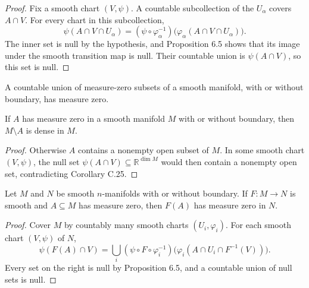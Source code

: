 \begin{proof}

\sketch Fix a smooth chart $(V,\psi)$. A countable subcollection of the $U_\alpha$ covers $A\cap V$. For every chart in this subcollection,
\[
\psi(A\cap V\cap U_\alpha)
=(\psi\circ\varphi_\alpha^{-1})
\bigl(\varphi_\alpha(A\cap V\cap U_\alpha)\bigr).
\]
The inner set is null by the hypothesis, and Proposition 6.5 shows that its image under the smooth transition map is null. Their countable union is $\psi(A\cap V)$, so this set is null.
\end{proof}

\begin{proposition}
\label{exer:6-7}




A countable union of measure-zero subsets of a smooth manifold, with or
without boundary, has measure zero.
\end{proposition}

\begin{proposition}
\label{prop:6-8}




If $A$ has measure zero in a smooth manifold $M$ with or without boundary, then $M\setminus A$ is dense in $M$.
\end{proposition}

\begin{proof}

\sketch Otherwise $A$ contains a nonempty open subset of $M$. In some smooth chart $(V,\psi)$, the null set $\psi(A\cap V)\subseteq\mathbb{R}^{\dim M}$ would then contain a nonempty open set, contradicting Corollary C.25.
\end{proof}

\begin{theorem}
\label{thm:6-9}




Let $M$ and $N$ be smooth $n$-manifolds with or without boundary. If $F:M\to N$ is smooth and $A\subseteq M$ has measure zero, then $F(A)$ has measure zero in $N$.
\end{theorem}

\begin{proof}

\sketch Cover $M$ by countably many smooth charts $(U_i,\varphi_i)$. For each smooth chart $(V,\psi)$ of $N$,
\[
\psi(F(A)\cap V)
=\bigcup_i(\psi\circ F\circ\varphi_i^{-1})
\bigl(\varphi_i(A\cap U_i\cap F^{-1}(V))\bigr).
\]
Every set on the right is null by Proposition 6.5, and a countable union of null sets is null.
\end{proof}



